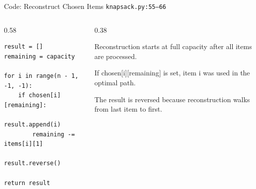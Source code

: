 \documentclass[aspectratio=169,11pt]{beamer}
\begin{document}
\begin{frame}[fragile]{Code: Reconstruct Chosen Items}
\scriptsize
{} \texttt{knapsack.py:55--66}

\vspace{0.08cm}
\begin{columns}[T,totalwidth=\textwidth]
\begin{column}{0.58\textwidth}
\begin{lstlisting}[style=cpcode]
result = []
remaining = capacity

for i in range(n - 1, -1, -1):
    if chosen[i][remaining]:
        result.append(i)
        remaining -= items[i][1]

result.reverse()

return result
\end{lstlisting}
\end{column}
\begin{column}{0.38\textwidth}
\begin{tightitemize}
  \item Reconstruction starts at full capacity after all items are processed.
  \item If chosen[i][remaining] is set, item i was used in the optimal path.
  \item The result is reversed because reconstruction walks from last item to first.
\end{tightitemize}
\end{column}
\end{columns}
\end{frame}
\end{document}
